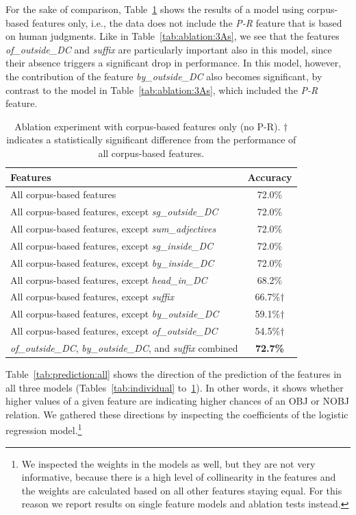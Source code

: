 \documentclass[output=paper]{langsci/langscibook}
\begin{document}
For the sake of comparison, Table~\ref{tab:ablation:noP-R} shows  the results of a model using corpus-based features only, i.e., the data does not include the \textit{P-R} feature that is based on human judgments. Like in Table~\ref{tab:ablation:3As}, we see that the features \textit{of\_outside\_DC} and \textit{suffix} are particularly important also in this model, since their absence triggers a significant drop in performance. In this model, however, the contribution of the feature \textit{by\_outside\_DC} also becomes significant, by contrast to the model in Table~\ref{tab:ablation:3As}, which included the \textit{P-R} feature.

\begin{table}
\caption{\label{tab:ablation:noP-R} Ablation experiment with corpus-based features only (no P-R). $\dagger$ indicates a statistically significant difference from the performance of all corpus-based features.}
{\small \begin{tabular}{lc}
\textbf{Features}&\textbf{Accuracy}\\
\hline
All corpus-based features&72.0\%\\
All corpus-based features, except \textit{sg\_outside\_DC}&72.0\%\\
All corpus-based features, except \textit{sum\_adjectives}&72.0\%\\
All corpus-based features, except \textit{sg\_inside\_DC}&72.0\%\\
All corpus-based features, except \textit{by\_inside\_DC}&72.0\%\\
All corpus-based features, except \textit{head\_in\_DC} &68.2\%\\
All corpus-based features, except \textit{suffix}&66.7\%$\dagger$\\
All corpus-based features, except \textit{by\_outside\_DC}&59.1\%$\dagger$\\
All corpus-based features, except \textit{of\_outside\_DC}& 54.5\%$\dagger$\\
\textit{of\_outside\_DC}, \textit{by\_outside\_DC}, and \textit{suffix} combined& \textbf{72.7\%}\\
\end{tabular}}
\end{table}


Table~\ref{tab:prediction:all} shows the direction of the prediction of the features  {in all three models (Tables~\ref{tab:individual} to~\ref{tab:ablation:noP-R})}. In other words, it shows whether higher values of a given feature are indicating higher chances of an OBJ or NOBJ relation. We gathered these directions by inspecting the coefficients of the logistic regression model.\footnote{We inspected the weights in the models as well, but they are not very informative, because there is a high level of collinearity in the features and the weights are calculated based on all other features staying equal. For this reason we report results on single feature models and ablation tests instead.}
\end{document}

